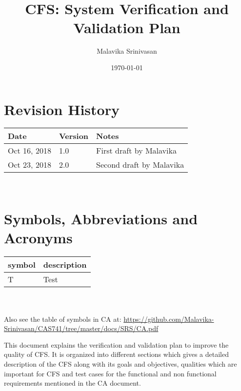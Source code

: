 \documentclass[12pt, titlepage]{article}
\newcommand{\famname}{CFS} %
\begin{document}
\title{CFS: System Verification and Validation Plan} 
\author{Malavika Srinivasan}
\date{\today}
	
\maketitle



\section{Revision History}

\begin{tabularx}{\textwidth}{p{3cm}p{2cm}X}
\toprule {\bf Date} & {\bf Version} & {\bf Notes}\\
\midrule
Oct 16, 2018 & 1.0 & First draft by Malavika\\
Oct 23, 2018 & 2.0 & Second draft by Malavika\\

\bottomrule
\end{tabularx}

~\newpage

\section{Symbols, Abbreviations and Acronyms}

\renewcommand{\arraystretch}{1.2}
\begin{tabular}{l l} 
  \toprule		
  \textbf{symbol} & \textbf{description}\\
  \midrule 
  T & Test\\
  \bottomrule
\end{tabular}\\
\\
Also see the table of symbols in CA at: \url{https://github.com/Malavika-Srinivasan/CAS741/tree/master/docs/SRS/CA.pdf}\\


\newpage

\tableofcontents

\listoftables

\listoffigures

\newpage



This document explains the verification and validation plan to improve the quality of \famname{}. It is organized into different sections which gives a detailed description of the \famname{} along with its goals and objectives, qualities which are important for \famname{} and test cases for the functional and non functional requirements mentioned in the CA document.
\end{document}
